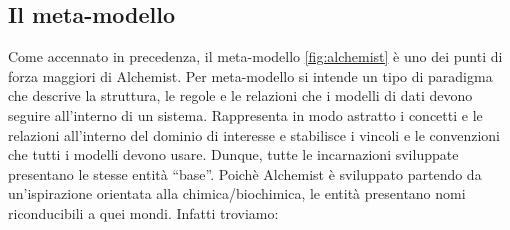 \subsection{Il meta-modello} 
Come accennato in precedenza, il meta-modello \cref{fig:alchemist} è uno dei punti di forza maggiori di Alchemist. 
Per meta-modello si intende un tipo di paradigma che descrive la struttura, le regole e le relazioni
che i modelli di dati devono seguire all'interno di un sistema. Rappresenta in modo astratto i 
concetti e le relazioni all'interno del dominio di interesse e stabilisce i vincoli e le convenzioni
che tutti i modelli devono usare. Dunque, tutte le incarnazioni sviluppate presentano le stesse entità
``base''. Poichè Alchemist è sviluppato partendo da un'ispirazione orientata alla chimica/biochimica,
le entità presentano nomi riconducibili a quei mondi. Infatti troviamo:
